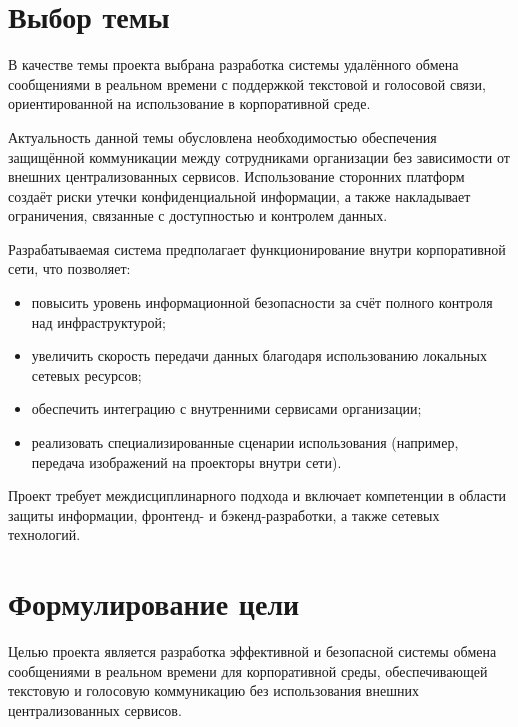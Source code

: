 \documentclass[14pt,a4paper]{extarticle}
\begin{document}
\section{Выбор темы}

В качестве темы проекта выбрана разработка системы удалённого обмена сообщениями в реальном времени с поддержкой текстовой и голосовой связи, ориентированной на использование в корпоративной среде.

Актуальность данной темы обусловлена необходимостью обеспечения защищённой коммуникации между сотрудниками организации без зависимости от внешних централизованных сервисов. Использование сторонних платформ создаёт риски утечки конфиденциальной информации, а также накладывает ограничения, связанные с доступностью и контролем данных.

Разрабатываемая система предполагает функционирование внутри корпоративной сети, что позволяет:
\begin{itemize}
\item повысить уровень информационной безопасности за счёт полного контроля над инфраструктурой;
\item увеличить скорость передачи данных благодаря использованию локальных сетевых ресурсов;
\item обеспечить интеграцию с внутренними сервисами организации;
\item реализовать специализированные сценарии использования (например, передача изображений на проекторы внутри сети).
\end{itemize}

Проект требует междисциплинарного подхода и включает компетенции в области защиты информации, фронтенд- и бэкенд-разработки, а также сетевых технологий.

\section{Формулирование цели}

Целью проекта является разработка эффективной и безопасной системы обмена сообщениями в реальном времени для корпоративной среды, обеспечивающей текстовую и голосовую коммуникацию без использования внешних централизованных сервисов.
\end{document}
